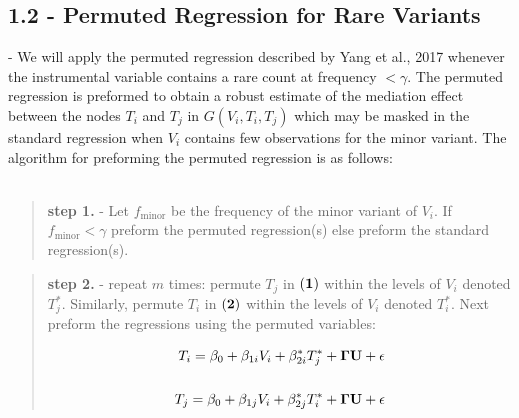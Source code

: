 \documentclass[12pt]{report}
\begin{document}
\subsection*{1.2 - Permuted Regression for Rare Variants} - We will apply the permuted regression described by Yang et al., 2017 whenever the instrumental variable contains a rare count at frequency $< \gamma$. The permuted regression is preformed to obtain a robust estimate of the mediation effect between the nodes $T_i$ and $T_j$ in $G(V_i, T_i, T_j)$ which may be masked in the standard regression when $V_i$ contains few observations for the minor variant. The algorithm for preforming the permuted regression is as follows:\\
\\
\begin{quote}
\textbf{step 1.} - Let $f_{\text{minor}}$ be the frequency of the minor variant of $V_i$. If $f_{\text{minor}} < \gamma$ preform the permuted regression(s) else preform the standard regression(s).
\end{quote}

\begin{quote}
\textbf{step 2.} - repeat $m$ times: permute $T_j$ in $\bf (1)$ within the levels of $V_i$ denoted $T_j^{\ast}$. Similarly, permute $T_i$ in $\bf (2)$ within the levels of $V_i$ denoted $T_i^{\ast}$. Next preform the regressions using the permuted variables:

\begin{eqnarray}
T_i = \beta_0 +\beta_{1i}V_i+\beta_{2i}^{\ast}T_j^{\ast}+{\bf \Gamma U}+ \epsilon \\
\nonumber\\
T_j = \beta_0 +\beta_{1j}V_i+\beta_{2j}^{\ast}T_i^{\ast}+{\bf \Gamma U}+ \epsilon \nonumber 
\end{eqnarray}

\end{quote}
\end{document}
